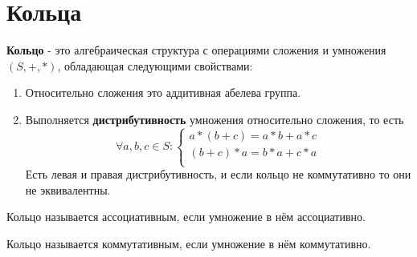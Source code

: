 \section{Кольца}

\textbf{Кольцо} - это алгебраическая структура с операциями сложения и умножения $(S, +, *)$, обладающая следующими свойствами:
\begin{enumerate}
	\item Относительно сложения это аддитивная абелева группа.
	
	\item Выполняется \textbf{дистрибутивность} умножения относительно сложения, то есть 
	$$
	\forall a, b, c \in S : 
	\begin{cases}
		a*(b+c) = a*b + a*c\\
		(b + c)* a = b * a + c * a\\
	\end{cases}
	$$
	Есть левая и правая дистрибутивность, и если кольцо не коммутативно то они не эквивалентны.
\end{enumerate}

Кольцо называется ассоциативным, если умножение в нём ассоциативно.

Кольцо называется коммутативным, если умножение в нём коммутативно.